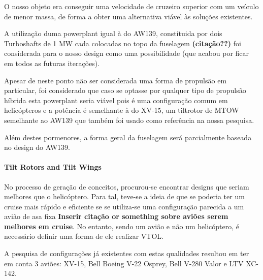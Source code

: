 O nosso objeto era conseguir uma velocidade de cruzeiro superior com um veículo de menor massa, de forma a obter uma alternativa viável às soluções existentes.\par

A utilização duma powerplant igual à do AW139, constítuida por dois Turboshafts de 1 MW cada colocadas no topo da fuselagem \textbf{(citação??)} foi considerada para o nosso design como uma possibilidade (que acabou por ficar em todos as futuras iterações). 

Apesar de neste ponto não ser considerada uma forma de propulsão em particular, foi considerado que caso se optasse por qualquer tipo de propulsão híbrida esta powerplant seria viável pois é uma configuração comum em helicópteros e a potência é semelhante à do XV-15, um tiltrotor de MTOW semelhante ao AW139 que também foi usado como referência na nossa pesquisa.\par

Além destes pormenores, a forma geral da fuselagem será parcialmente baseada no design do AW139.\par

\paragraph{Tilt Rotors and Tilt Wings}

No processo de geração de conceitos, procurou-se encontrar designs que seriam melhores que o helicóptero. Para tal, teve-se a ideia de que se poderia ter um cruise mais rápido e eficiente se se utiliza-se uma configuração parecida a um avião de asa fixa {\large{\textbf{Inserir citação or something sobre aviões serem melhores em cruise}}}. No entanto, sendo um avião e não um helicóptero, é necessário definir uma forma de ele realizar VTOL.\par
A pesquisa de configurações já existentes com estas qualidades resultou em ter em conta 3 aviões: XV-15, Bell Boeing V-22 Osprey, Bell V-280 Valor e LTV XC-142.\par

